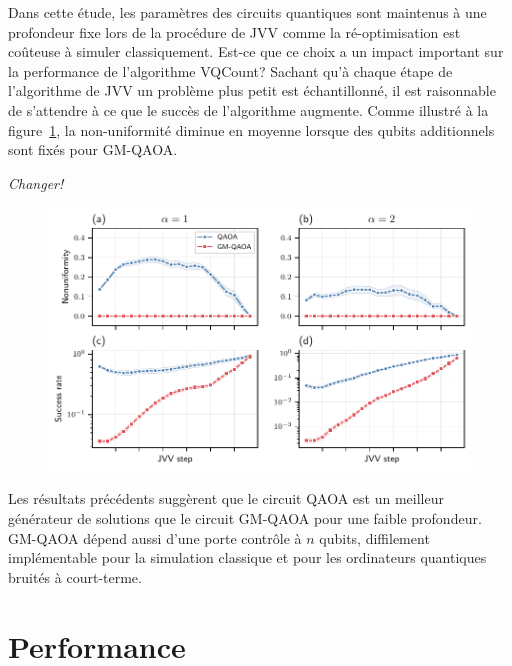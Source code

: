 Dans cette étude, les paramètres des circuits quantiques sont maintenus à une profondeur fixe lors de la procédure de JVV comme la ré-optimisation est coûteuse à simuler classiquement. Est-ce que ce choix a un impact important sur la performance de l'algorithme VQCount? Sachant qu'à chaque étape de l'algorithme de JVV un problème plus petit est échantillonné, il est raisonnable de s'attendre à ce que le succès de l'algorithme augmente. Comme illustré à la figure~\ref{fig:nae3sat-jvv-steps}, la non-uniformité diminue en moyenne lorsque des qubits additionnels sont fixés pour GM-QAOA. 

\textcolor{mydarkred}{\textit{Changer!}}

\begin{figure}[ht!]
    \centering
    \includegraphics[width=1\textwidth]{figures/nae3sat-jvv-steps}
    \caption{}
    \label{fig:nae3sat-jvv-steps}
\end{figure}

Les résultats précédents suggèrent que le circuit QAOA est un meilleur générateur de solutions que le circuit GM-QAOA pour une faible profondeur. GM-QAOA dépend aussi d'une porte contrôle à $n$ qubits, diffilement implémentable pour la simulation classique et pour les ordinateurs quantiques bruités à court-terme. 


\section{Performance}

